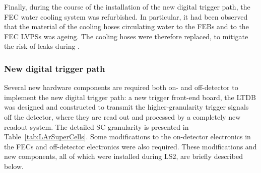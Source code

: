 \documentclass[cernpreprint, atlasdraft=false, UKenglish,british,orcidlogo, texmf, orcidlogo]{atlasdoc}
\begin{document}
Finally, during the course of the installation of the new digital trigger path, the \gls{FEC} water cooling
system was refurbished. In particular, it had been observed that
the material of the cooling hoses circulating water to the \glspl{FEB}
and to the \gls{FEC} \glspl{LVPS} was ageing.
The cooling hoses were therefore replaced, to mitigate the risk of leaks during \RunThr.


 
 
\subsubsection{New digital trigger path}
\label{sec:LArDigitalTrigger}
 

 
Several new hardware components are required both on- and off-detector to implement the new digital trigger path:
a new trigger front-end board, the \gls{LTDB} was designed and constructed to transmit the higher-granularity trigger signals
off the detector, where they are read out and processed by a completely new readout system. The detailed \gls{SC} granularity is presented in Table~\ref{tab:LArSuperCells}.
Some modifications to the on-detector electronics in the \glspl{FEC} and off-detector electronics were also required.
These modifications and new components, all of which were installed during \gls{LS2}, are briefly described below.
 
\end{document}

